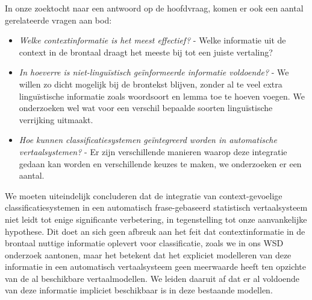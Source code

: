 In onze zoektocht naar een antwoord op de hoofdvraag, komen er ook een aantal gerelateerde vragen aan bod:

\begin{itemize}
\item \emph{Welke contextinformatie is het meest effectief?} - Welke informatie uit de context in de brontaal draagt het
    meeste bij tot een juiste vertaling?
\item \emph{In hoeverre is niet-linguïstisch geïnformeerde informatie voldoende?} - We willen zo dicht mogelijk bij de
    brontekst blijven, zonder al te veel extra linguïstische informatie zoals woordsoort en lemma toe te
    hoeven voegen. We onderzoeken wel wat voor een verschil bepaalde soorten linguïstische verrijking uitmaakt.
\item \emph{Hoe kunnen classificatiesystemen geïntegreerd worden in automatische vertaalsystemen?} - Er zijn
    verschillende manieren waarop deze integratie gedaan kan worden en verschillende keuzes te maken, we onderzoeken er een aantal.
\end{itemize}

We moeten uiteindelijk concluderen dat de integratie van context-gevoelige classificatiesystemen in een automatisch
frase-gebaseerd statistisch vertaalsysteem niet leidt tot enige significante verbetering, in tegenstelling tot onze
aanvankelijke hypothese. Dit doet an sich geen afbreuk aan het feit dat contextinformatie in de brontaal nuttige
informatie oplevert voor classificatie, zoals we in ons WSD onderzoek aantonen, maar het betekent dat het expliciet
modelleren van deze informatie in een automatisch vertaalsysteem geen meerwaarde heeft ten opzichte van de al beschikbare
vertaalmodellen. We leiden daaruit af dat er al voldoende van deze informatie impliciet beschikbaar is in deze bestaande
modellen.

